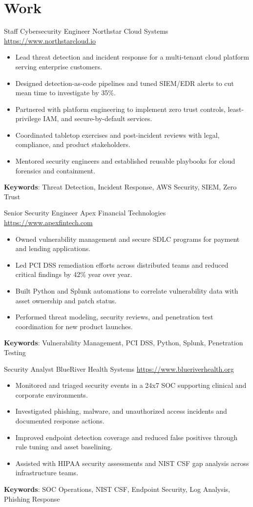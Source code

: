 \documentclass[a4paper, serif, 10pt]{moderncv}
\begin{document}
\section{Work}

        {Staff Cybersecurity Engineer}
        {Northstar Cloud Systems}
        {\url{https://www.northstarcloud.io}}
        {}
        {\begin{itemize}
\item Lead threat detection and incident response for a multi-tenant cloud platform serving enterprise customers.
\item Designed detection-as-code pipelines and tuned SIEM/EDR alerts to cut mean time to investigate by 35\%.
\item Partnered with platform engineering to implement zero trust controls, least-privilege IAM, and secure-by-default services.
\item Coordinated tabletop exercises and post-incident reviews with legal, compliance, and product stakeholders.
\item Mentored security engineers and established reusable playbooks for cloud forensics and containment.
\end{itemize}
\textbf{Keywords}: Threat Detection, Incident Response, AWS Security, SIEM, Zero Trust}

        {Senior Security Engineer}
        {Apex Financial Technologies}
        {\url{https://www.apexfintech.com}}
        {}
        {\begin{itemize}
\item Owned vulnerability management and secure SDLC programs for payment and lending applications.
\item Led PCI DSS remediation efforts across distributed teams and reduced critical findings by 42\% year over year.
\item Built Python and Splunk automations to correlate vulnerability data with asset ownership and patch status.
\item Performed threat modeling, security reviews, and penetration test coordination for new product launches.
\end{itemize}
\textbf{Keywords}: Vulnerability Management, PCI DSS, Python, Splunk, Penetration Testing}

        {Security Analyst}
        {BlueRiver Health Systems}
        {\url{https://www.blueriverhealth.org}}
        {}
        {\begin{itemize}
\item Monitored and triaged security events in a 24x7 SOC supporting clinical and corporate environments.
\item Investigated phishing, malware, and unauthorized access incidents and documented response actions.
\item Improved endpoint detection coverage and reduced false positives through rule tuning and asset baselining.
\item Assisted with HIPAA security assessments and NIST CSF gap analysis across infrastructure teams.
\end{itemize}
\textbf{Keywords}: SOC Operations, NIST CSF, Endpoint Security, Log Analysis, Phishing Response}
\end{document}
